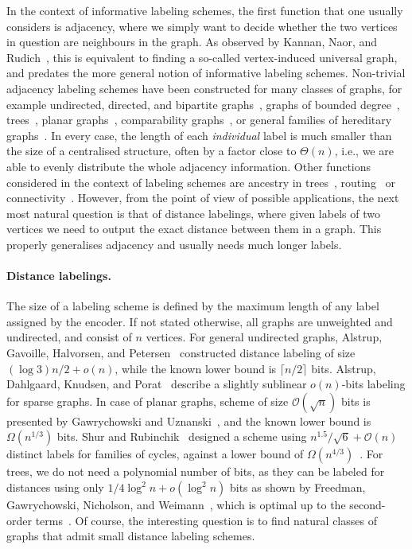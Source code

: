 \documentclass[a4paper,11pt]{article}
\newcommand{\Oh}{\mathcal{O}}
\begin{document}
In the context of informative labeling schemes, the first function that one usually considers is adjacency,
where we simply want to decide whether the two vertices in question are neighbours in the graph.
As observed by Kannan, Naor, and Rudich~\cite{Kannan}, this is equivalent to finding a so-called vertex-induced
universal graph, and predates the more general notion of informative labeling schemes.
Non-trivial adjacency labeling schemes have been constructed for many classes of graphs,
for example undirected, directed, and bipartite graphs~\cite{alstrup2015adjacency},
graphs of bounded degree~\cite{EsperetLO08}, trees~\cite{alstrup2015optimal}, planar graphs~\cite{Planar1,PlanarMain},
comparability graphs~\cite{BonamyEGS21}, or general families of hereditary graphs~\cite{HatamiH22,Monotone}.
In every case, the length of each \emph{individual} label is much smaller than the size of a centralised structure,
often by a factor close to $\Theta(n)$, i.e., we are able to evenly distribute the whole adjacency information.
Other functions considered in the context of labeling schemes
are  ancestry in trees~\cite{FraigniaudAncestry,GawrychowskiKLP18},
routing~\cite{thorup2001compact,FraigniaudG01,GawrychowskiJL21} or connectivity~\cite{Korman10}.
However, from the point of view of possible applications, the next most natural question is that of distance labelings,
where given labels of two vertices we need to output the exact distance between them in a graph.
This properly generalises adjacency and usually needs much longer labels.

\paragraph{Distance labelings.}
The size of a labeling scheme is defined by the maximum length of any label assigned by the encoder.
If not stated otherwise, all graphs are unweighted and undirected, and consist of $n$ vertices.
For general undirected graphs, Alstrup, Gavoille, Halvorsen, and Petersen~\cite{alstrup2016simpler} constructed distance
labeling of size $(\log{3})n/2 + o(n)$, while the known lower bound is $\lceil n/2 \rceil$ bits.
Alstrup, Dahlgaard, Knudsen, and Porat~\cite{AlstrupDKP16} describe a slightly sublinear $o(n)$-bits labeling for sparse graphs. 
In case of planar graphs, scheme of size $\Oh(\sqrt{n})$ bits is presented by Gawrychowski and Uznanski~\cite{GawrychowskiU16},
and the known lower bound is $\Omega(n^{1/3})$ bits.
Shur and Rubinchik~\cite{ShurR24} designed a scheme using $n^{1.5}/\sqrt{6}+\Oh(n)$ distinct labels for families of cycles,
against a lower bound of $\Omega(n^{4/3})$~\cite{DBLP:journals/algorithmica/KormanPR10}.
For trees, we do not need a polynomial number of bits, as they can be labeled for distances using only
$1/4 \log^2{n}+o(\log^2{n})$ bits as shown by Freedman, Gawrychowski, Nicholson, and Weimann~\cite{FGNW16},
which is optimal up to the second-order terms~\cite{alstrup2015distance}. Of course, the interesting
question is to find natural classes of graphs that admit small distance labeling schemes.
\end{document}
